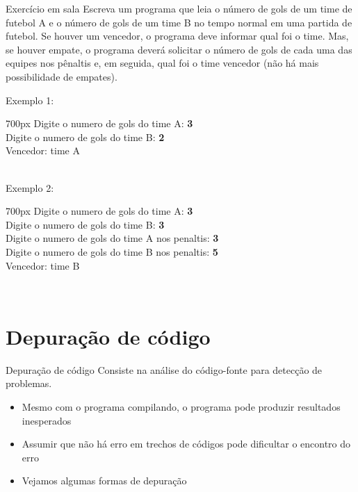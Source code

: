 \documentclass[portuguese,10pt,xcolor=table]{bredelebeamer}
\begin{document}
	\begin{frame}
	\begin{alertblock}{ Exercício em sala} Escreva um programa que leia o número de gols de um time de futebol A e o número de gols de um time B no tempo normal em uma partida de futebol. Se houver um vencedor, o programa deve informar qual foi o time. Mas, se houver empate, o programa deverá solicitar o número de gols de cada uma das equipes nos pênaltis e, em seguida, qual foi o time vencedor (não há mais possibilidade de empates).

		Exemplo 1:
		\colorbox{gray!15}{
			\begin{varwidth}{700px}
				Digite o numero de gols do time A: \textbf{3}\\
				Digite o numero de gols do time B: \textbf{2}\\
				Vencedor: time A
			\end{varwidth}
		}\\

		Exemplo 2:
		\colorbox{gray!15}{
			\begin{varwidth}{700px}
				Digite o numero de gols do time A: \textbf{3}\\
				Digite o numero de gols do time B: \textbf{3}\\
				Digite o numero de gols do time A nos penaltis: \textbf{3}\\
				Digite o numero de gols do time B nos penaltis: \textbf{5}\\
				Vencedor: time B
			\end{varwidth}
		}\\

	\end{alertblock}
	\end{frame}
	\section{Depuração de código}

	\begin{frame}[c]
		\begin{center}
			\structure{\large \insertsection}
		\end{center}
	\end{frame} 

	\setbeamercovered{transparent}
	\begin{frame}
		\begin{beamerboxesrounded}{Depuração de código}
		Consiste na análise do código-fonte para detecção de problemas.
		\end{beamerboxesrounded}

		\begin{itemize}
		\item Mesmo com o programa compilando, o programa pode produzir resultados inesperados
		\item Assumir que não há erro em trechos de códigos pode dificultar o encontro do erro
		\item Vejamos algumas formas de depuração
		\end{itemize}
	\end{frame}
\end{document}
